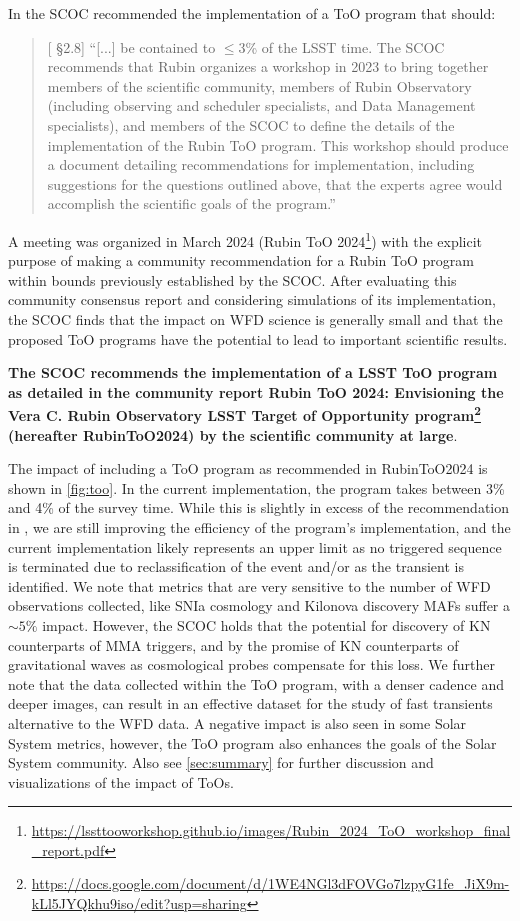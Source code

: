 In  the SCOC recommended the implementation of a ToO program that should:

\begin{quote}
    {[ \S2.8] ``[...] be contained to $\leq$3\% of the LSST time. The SCOC recommends that Rubin organizes a workshop in 2023 to bring together members of the scientific community, members of Rubin Observatory (including observing and scheduler specialists, and Data Management specialists), and members of the SCOC to define the details of the implementation of the Rubin ToO program. This workshop should produce a document detailing recommendations for implementation, including suggestions for the questions outlined above, that the experts agree would accomplish the scientific goals of the program.''}
\end{quote}

A meeting was organized in March 2024 (Rubin ToO 2024\footnote{\url{https://lssttooworkshop.github.io/images/Rubin_2024_ToO_workshop_final_report.pdf}}) with the explicit purpose of making a community recommendation for a Rubin ToO program within bounds previously established by the SCOC. After evaluating this community consensus report and considering simulations of its implementation, the SCOC finds that the impact on WFD science is generally small and that the proposed ToO programs have the potential to lead to important scientific results. 

 {\bf The SCOC recommends the implementation of a LSST ToO program as detailed in the community report Rubin ToO 2024: 
Envisioning the Vera C. Rubin Observatory LSST Target of Opportunity program\footnote{\url{https://docs.google.com/document/d/1WE4NGl3dFOVGo7lzpyG1fe_JiX9m-kLl5JYQkhu9iso/edit?usp=sharing}} (hereafter RubinToO2024) by the scientific community at large}. 


The impact of including a ToO program as recommended in RubinToO2024 is shown in \autoref{fig:too}. In the current implementation, the program takes between 3\% and 4\% of the survey time. While this is slightly in excess of the recommendation in , we are still improving the efficiency of the program's implementation, and the current implementation likely represents an upper limit as no triggered sequence is terminated due to reclassification of the event and/or as the transient is identified.
We note that metrics that are very sensitive to the number of WFD observations collected, like SNIa cosmology and Kilonova discovery MAFs suffer a $\sim5\%$ impact. However, the SCOC holds that the potential for discovery of KN counterparts of MMA triggers, and by the promise of KN counterparts of gravitational waves as cosmological probes \citep[\eg ,][]{PhysRevResearch.2.022006, gianfagna2024potential} compensate for this loss. We further note that the data collected within the ToO program, with a denser cadence and deeper images, can result in an effective dataset for the study of fast transients alternative to the WFD data. A negative impact is also seen in some Solar System metrics, however, the ToO program also enhances the goals of the Solar System community. Also see \autoref{sec:summary} for further discussion and visualizations of the impact of ToOs.

